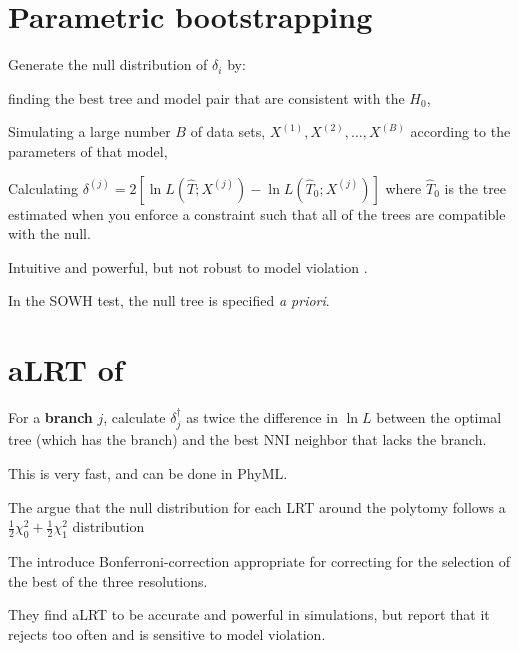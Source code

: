 \documentclass[landscape]{foils}
\begin{document}
\myNewSlide
\section*{Parametric bootstrapping}
Generate the null distribution of $\delta_i$ by:
\begin{compactitem}
	\item finding the best tree and model pair that are consistent with the $H_0$,
	\item Simulating a large number $B$ of data sets, $X^{(1)}, X^{(2)},\ldots,X^{(B)}$ according to the parameters of that model,
	\item Calculating $\delta^{(j)} = 2\left[\ln L (\hat{T}; X^{(j)}) - \ln L (\hat{T}_{0}; X^{(j)})\right]$ where $\hat{T}_{0}$ is the tree estimated when you enforce a constraint such that all of the trees are compatible with the null.
\end{compactitem}
Intuitive and powerful, but not robust to model violation \citep{Buckley2002}.

In the SOWH test, the null tree is specified {\em a priori}.

\myNewSlide
 


\myNewSlide
 

\myNewSlide
\section*{aLRT of \citet{AnisimovaG2006}}
\begin{compactitem}
	\item For a {\bf branch} $j$, calculate $\delta_{j}^{\dag}$ as twice the difference in $\ln L$ between the optimal tree (which has the branch) and the best NNI neighbor that lacks the branch.
	\item This is very fast, and can be done in PhyML.
	\item The argue that the null distribution for each LRT around the polytomy follows a $\frac{1}{2}\chi_0^2 + \frac{1}{2}\chi_1^2$ distribution
	\item The introduce Bonferroni-correction appropriate for correcting for the selection of the best of the three resolutions.
	\item They find aLRT to be accurate and powerful in simulations, but \citet{AnisimovaGDDG2011} report that it rejects too often and is sensitive to model violation.
\end{compactitem}
\end{document}
